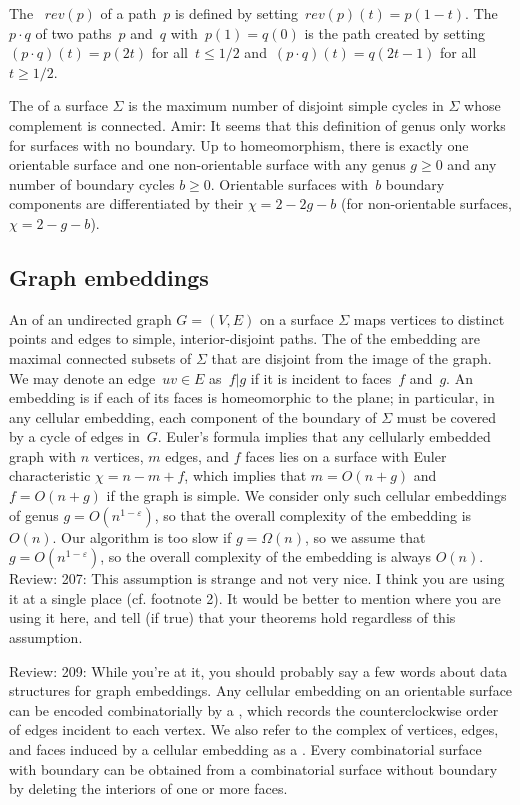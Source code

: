 \documentclass[letterpaper,review]{siamart190516}
\def\rev{\mathit{rev}}
\let\eps\varepsilon
\def\modified#1{\color{blue}#1 \color{black}}
\def\anote#1{\color{purple}Amir: #1 \color{black}}
\def\rnote#1{\color{red}Review: #1 \color{black}}
\begin{document}
The ~$\rev(p)$ of a path~$p$ is defined by
setting~$\rev(p)(t) = p(1-t)$. The ~$p \cdot q$ of two
paths~$p$ and~$q$ with~$p(1)=q(0)$ is the path created by
setting~$(p\cdot q)(t) = p(2t)$ for all~$t \leq 1/2$
and~$(p\cdot q)(t) = q(2t-1)$ for all~$t \geq 1/2$.

The  of a surface $\Sigma$ is the maximum number of disjoint simple cycles in $\Sigma$ whose complement is connected.
\anote{It seems that this definition of genus only works for surfaces with no boundary.}
 Up to homeomorphism,
there is exactly one orientable surface and one non-orientable surface with any genus $g\ge 0$ and any number of
boundary cycles $b\ge 0$.
Orientable surfaces with~$b$ boundary components are differentiated by their  ${\chi = 2 - 2g - b}$ (for non-orientable surfaces, ${\chi = 2 - g - b}$).


\subsection{Graph embeddings}
\label{SS:embeddings}


An  of an undirected graph $G=(V,E)$ on a surface $\Sigma$ maps vertices to distinct points and edges to simple, interior-disjoint paths.  The  of the embedding are maximal connected subsets of $\Sigma$ that are disjoint from the image of the graph.
We may denote an edge~$uv \in E$ as~$f | g$ if it is incident to faces~$f$ and~$g$.
An embedding is  if each of its faces is homeomorphic to the plane; in particular, in any cellular embedding, each component of the boundary of $\Sigma$ must be covered by a cycle of edges in~$G$.  Euler's formula implies that any cellularly embedded graph with $n$ vertices, $m$ edges, and $f$ faces lies on a surface with Euler characteristic $\chi = n-m+f$, which implies that $m = O(n+g)$ and $f=O(n+g)$
if the graph is simple.
We consider only such
cellular embeddings of genus $g=O(n^{1-\eps})$, so that the overall complexity of the embedding is $O(n)$.
\modified{Our algorithm is too slow if $g=\Omega(n)$, so we assume that $g=O(n^{1-\eps})$, so the overall complexity of the embedding is always $O(n)$.}
\rnote{207: This assumption is strange and not very nice. I think you are using it at a single place (cf. footnote 2). It would be better to mention where you are using it here, and tell (if true) that your theorems hold regardless of this assumption.}

\rnote{209: While you're at it, you should probably say a few words about data structures for graph embeddings.}
Any cellular embedding on an orientable surface can be encoded combinatorially by a , which records the counterclockwise order of edges incident to each vertex.
We also refer to the complex of vertices, edges, and faces induced by a cellular embedding as a .
Every combinatorial surface with boundary can be obtained from a combinatorial surface without boundary by deleting the interiors of one or more faces.
\end{document}

